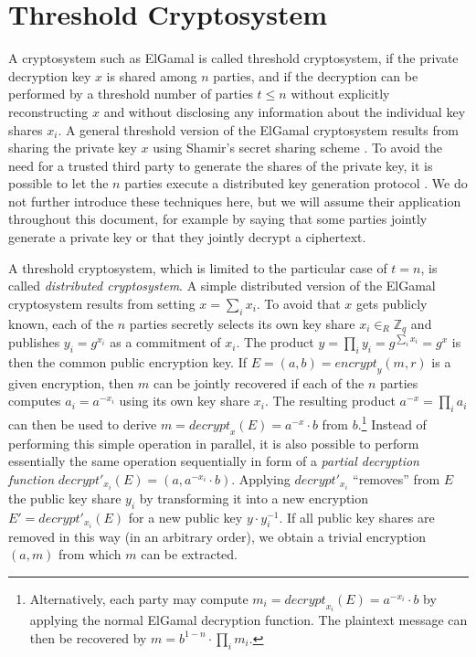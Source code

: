 \documentclass[bibtotoc,halfparskip,oneside]{scrreprt}
\begin{document}
	
	\section{Threshold Cryptosystem} 
	
	A cryptosystem such as ElGamal is called threshold cryptosystem, if the private decryption key $x$ is shared among $n$ parties, and if the decryption can be performed by a threshold number of parties $t \leq n$ without explicitly reconstructing $x$ and without disclosing any information about the individual key shares $x_i$. A general threshold version of the ElGamal cryptosystem results from sharing the private key $x$ using Shamir's secret sharing scheme \cite{pedersen91,shamir79b}. To avoid the need for a trusted third party to generate the shares of the private key, it is possible to let the $n$ parties execute a distributed key generation protocol \cite{GJKR99}. We do not further introduce these techniques here, but we will assume their application throughout this document, for example by saying that some parties jointly generate a private key or that they jointly decrypt a ciphertext.
	
	A threshold cryptosystem, which is limited to the particular case of $t=n$, is called \emph{distributed cryptosystem}. A simple distributed version of the ElGamal cryptosystem results from setting $x=\sum_i x_i$. To avoid that $x$ gets publicly known, each of the $n$ parties secretly selects its own key share $x_i \in_R\mathbb{Z}_q$ and publishes $y_i=g^{x_i}$ as a commitment of $x_i$. The product $y=\prod_i y_i = g^{\sum_i x_i}=g^x$ is then the common public encryption key. If $E=(a,b)=\mathit{encrypt}_y(m,r)$ is a given encryption, then $m$ can be jointly recovered if each of the $n$ parties computes $a_i=a^{-x_i}$ using its own key share $x_i$. The resulting product $a^{-x}=\prod_i a_i$ can then be used to derive $m=\mathit{decrypt}_x(E)=a^{-x}\cdot b$ from $b$.\footnote{Alternatively, each party may compute $m_i=\mathit{decrypt}_{x_i}(E)=a^{-x_i}\cdot b$ by applying the normal ElGamal decryption function. The plaintext message can then be recovered by $m=b^{1-n}\cdot\prod_i m_i$.} Instead of performing this simple operation in parallel, it is also possible to perform essentially the same operation sequentially in form of a \emph{partial decryption function} $\mathit{decrypt}'_{x_i}(E)=(a,a^{-x_i}\cdot b)$. Applying $\mathit{decrypt}'_{x_i}$ ``removes'' from $E$ the public key share $y_i$ by transforming it into a new encryption $E'=\mathit{decrypt}'_{x_i}(E)$ for a new public key $y\cdot y_i^{-1}$. If all public key shares are removed in this way (in an arbitrary order), we obtain a trivial encryption $(a,m)$ from which $m$ can be extracted.
	
\end{document}
